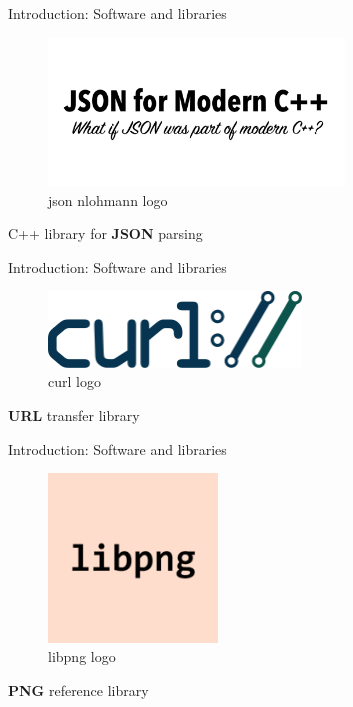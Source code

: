 \documentclass[10pt]{beamer}
\begin{document}
\begin{frame}{Introduction: Software and libraries}
  \Large
  \begin{figure}[H]
      \centering
      \includegraphics[width=0.7\textwidth]{images/logo-nlohmann.png}
      \caption{json nlohmann logo\cite{json-nlohmann}}
  \end{figure}
  \begin{center}
    \Large C++ library for \textbf{JSON} parsing
  \end{center}
\end{frame}

\begin{frame}{Introduction: Software and libraries}
  \Large
  \begin{figure}[H]
      \centering
      \includegraphics[width=0.6\textwidth]{images/logo-curl.png}
      \caption{curl logo\cite{curl}}
  \end{figure}
  \begin{center}
    \Large \textbf{URL} transfer library
  \end{center}
\end{frame}

\begin{frame}{Introduction: Software and libraries}
  \Large
  \begin{figure}[H]
      \centering
      \includegraphics[width=0.4\textwidth]{images/logo-libpng.png}
      \caption{libpng logo\cite{libpng}}
  \end{figure}
  \begin{center}
    \Large \textbf{PNG} reference library
  \end{center}
\end{frame}
\end{document}
